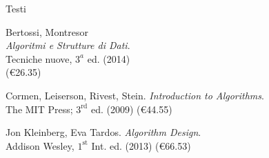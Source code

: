 \begin{frame}{Testi}


\vspace{-9pt}
\begin{myboxtitle}
\BI
\item Bertossi, Montresor\\
\alert{\emph{Algoritmi e Strutture di Dati}}. \\
Tecniche nuove, $3^a$ ed. (2014)\\
(\euro 26.35)
\EI
\end{myboxtitle}

\begin{myboxtitle}[Approfondimenti]
\BI
\item Cormen, Leiserson, Rivest, Stein. \alert{\emph{Introduction to Algorithms}}. \\The MIT Press; $3^{\textrm{rd}}$ ed. (2009) (\euro 44.55)
\item Jon Kleinberg, Eva Tardos. \alert{\emph{Algorithm Design}}. \\Addison Wesley, $1^{\textrm{st}}$ Int. ed. (2013) (\euro 66.53)
\EI
\end{myboxtitle}


\end{frame}
